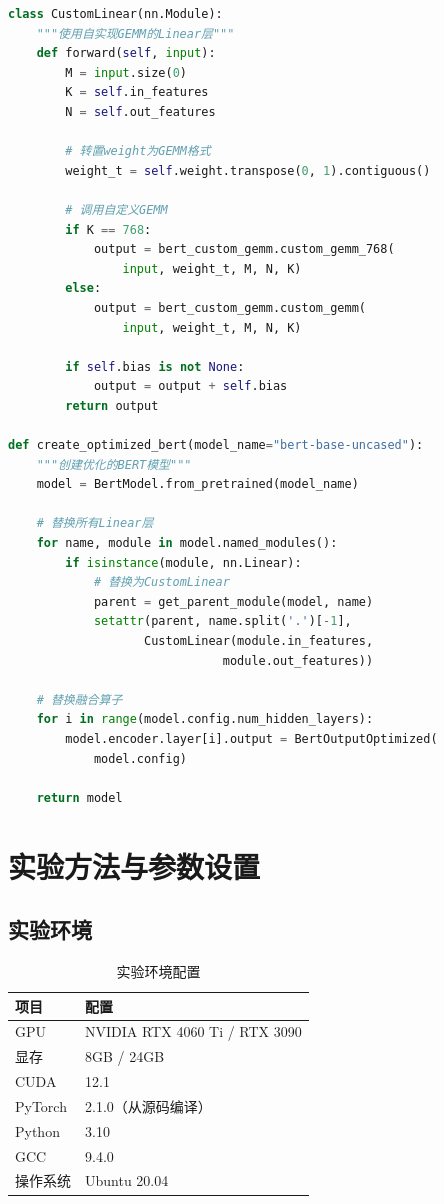 \documentclass[12pt,a4paper]{article}
\begin{document}
\begin{lstlisting}[language=Python,caption=模型集成示例]
class CustomLinear(nn.Module):
    """使用自实现GEMM的Linear层"""
    def forward(self, input):
        M = input.size(0)
        K = self.in_features
        N = self.out_features
        
        # 转置weight为GEMM格式
        weight_t = self.weight.transpose(0, 1).contiguous()
        
        # 调用自定义GEMM
        if K == 768:
            output = bert_custom_gemm.custom_gemm_768(
                input, weight_t, M, N, K)
        else:
            output = bert_custom_gemm.custom_gemm(
                input, weight_t, M, N, K)
        
        if self.bias is not None:
            output = output + self.bias
        return output

def create_optimized_bert(model_name="bert-base-uncased"):
    """创建优化的BERT模型"""
    model = BertModel.from_pretrained(model_name)
    
    # 替换所有Linear层
    for name, module in model.named_modules():
        if isinstance(module, nn.Linear):
            # 替换为CustomLinear
            parent = get_parent_module(model, name)
            setattr(parent, name.split('.')[-1], 
                   CustomLinear(module.in_features, 
                              module.out_features))
    
    # 替换融合算子
    for i in range(model.config.num_hidden_layers):
        model.encoder.layer[i].output = BertOutputOptimized(
            model.config)
    
    return model
\end{lstlisting}

\section{实验方法与参数设置}

\subsection{实验环境}

\begin{table}[H]
\centering
\caption{实验环境配置}
\begin{tabular}{ll}
\toprule
\textbf{项目} & \textbf{配置} \\
\midrule
GPU & NVIDIA RTX 4060 Ti / RTX 3090 \\
显存 & 8GB / 24GB \\
CUDA & 12.1 \\
PyTorch & 2.1.0（从源码编译） \\
Python & 3.10 \\
GCC & 9.4.0 \\
操作系统 & Ubuntu 20.04 \\
\bottomrule
\end{tabular}
\end{table}
\end{document}
